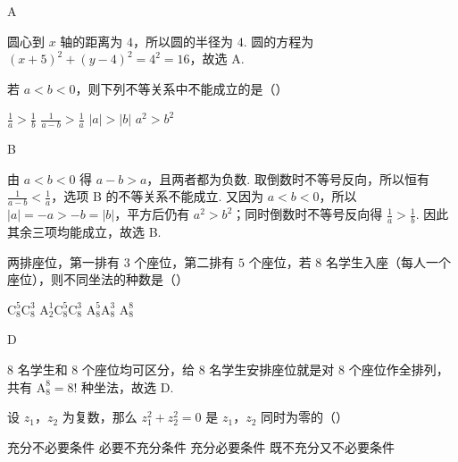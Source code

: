\documentclass[UTF8,a4paper,oneside,11pt]{ctexbook}
\begin{document}
\begin{answer}
A
\end{answer}

\begin{solution}
圆心到 \(x\) 轴的距离为 \(4\)，所以圆的半径为 \(4\). 圆的方程为 \((x+5)^2+(y-4)^2=4^2=16\)，故选 A.
\end{solution}

\begin{problem}
若 \(a<b<0\)，则下列不等关系中不能成立的是（\quad）

\choices
    {\(\frac{1}{a}>\frac{1}{b}\)}
    {\(\frac{1}{a-b}>\frac{1}{a}\)}
    {\(|a|>|b|\)}
    {\(a^2>b^2\)}
\end{problem}

\begin{answer}
B
\end{answer}

\begin{solution}
由 \(a<b<0\) 得 \(a-b>a\)，且两者都为负数. 取倒数时不等号反向，所以恒有 \(\frac{1}{a-b}<\frac{1}{a}\)，选项 B 的不等关系不能成立. 又因为 \(a<b<0\)，所以 \(|a|=-a>-b=|b|\)，平方后仍有 \(a^2>b^2\)；同时倒数时不等号反向得 \(\frac{1}{a}>\frac{1}{b}\). 因此其余三项均能成立，故选 B.
\end{solution}

\begin{problem}
两排座位，第一排有 \(3\) 个座位，第二排有 \(5\) 个座位，若 \(8\) 名学生入座（每人一个座位），则不同坐法的种数是（\quad）

\choices
    {\(\mathrm C_8^5 \mathrm C_8^3\)}
    {\(\mathrm A_2^1 \mathrm C_8^5 \mathrm C_8^3\)}
    {\(\mathrm A_8^5 \mathrm A_8^3\)}
    {\(\mathrm A_8^8\)}
\end{problem}

\begin{answer}
D
\end{answer}

\begin{solution}
8 名学生和 8 个座位均可区分，给 8 名学生安排座位就是对 8 个座位作全排列，共有 \(\mathrm A_8^8=8!\) 种坐法，故选 D.
\end{solution}

\begin{problem}
设 \(z_1\)，\(z_2\) 为复数，那么 \(z_1^2+z_2^2=0\) 是 \(z_1\)，\(z_2\) 同时为零的（\quad）

\choices
    {充分不必要条件}
    {必要不充分条件}
    {充分必要条件}
    {既不充分又不必要条件}
\end{problem}
\end{document}
